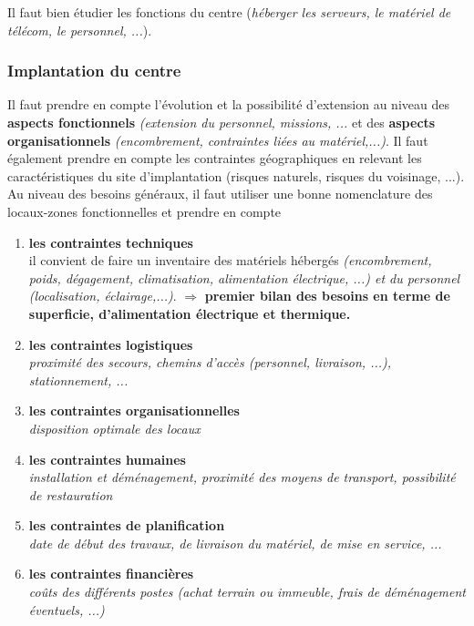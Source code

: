 \documentclass[10pt,a4paper,oneside,titlepage]{report}
\newcommand{\titre}[1]{\textcolor{title}{#1}}
\newcommand{\strong}[1]{\textbf{\titre{#1}}}
\begin{document}
\begin{sffamily}
Il faut bien étudier les fonctions du centre (\textit{héberger les serveurs, le matériel de télécom, le personnel, ...}).

\subsubsection{Implantation du centre}

Il faut prendre en compte l'évolution et la possibilité d'extension au niveau des \strong{aspects fonctionnels} \textit{(extension du personnel, missions, ...} et des \strong{aspects organisationnels} \textit{(encombrement, contraintes liées au 
matériel,...)}. Il faut également prendre en compte les contraintes géographiques en relevant les caractéristiques du site d'implantation (risques naturels, risques du voisinage, ...). \\

Au niveau des besoins généraux, il faut utiliser une bonne nomenclature des locaux-zones fonctionnelles et prendre en compte
\begin{enumerate}
\item \strong{les contraintes techniques}\\
il convient de faire un inventaire des matériels hébergés  \textit{(encombrement, poids, dégagement, climatisation, alimentation électrique, ...) et du personnel \textit{(localisation, éclairage,...)}}. $\Rightarrow$ \strong{premier bilan des besoins 
en terme de superficie, d'alimentation électrique et thermique.}
\item \strong{les contraintes logistiques}\\
\textit{proximité des secours, chemins d'accès (personnel, livraison, ...), stationnement, ...}
\item \strong{les contraintes organisationnelles}\\
\textit{disposition optimale des locaux}
\item \strong{les contraintes humaines}\\
\textit{installation et déménagement, proximité des moyens de transport, possibilité de restauration}
\item \strong{les contraintes de planification}\\
\textit{date de début des travaux, de livraison du matériel, de mise en service, ...}
\item \strong{les contraintes financières}\\
\textit{coûts des différents postes (achat terrain ou immeuble, frais de déménagement éventuels, ...)}
\end{enumerate}


\end{sffamily}
\end{document}
